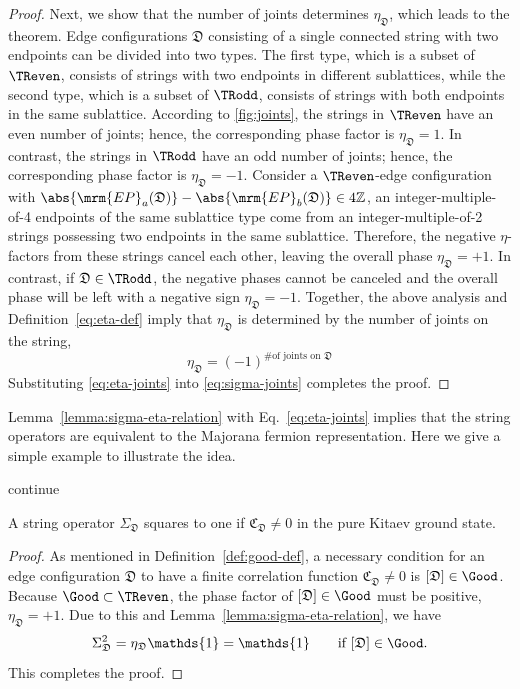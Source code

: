 \begin{proof}
    Next, we show that the number of joints determines $\eta_\mathfrak{D}$, which leads to the theorem. Edge configurations $\mathfrak{D}$ consisting of a single connected string with two endpoints can be divided into two types. The first type, which is a subset of $\TReven$, consists of strings with two endpoints in different sublattices, while the second type, which is a subset of $\TRodd$, consists of strings with both endpoints in the same sublattice. According to \autoref{fig:joints}, the strings in $\TReven$ have an even number of joints; hence, the corresponding phase factor is $\eta_\mathfrak{D} = 1$. In contrast, the strings in $\TRodd$ have an odd number of joints; hence, the corresponding phase factor is $\eta_\mathfrak{D} = -1$. Consider a $\TReven$-edge configuration with $\abs{\mrm{EP}_a(\mathfrak{D})} - \abs{\mrm{EP}_b(\mathfrak{D})} \in 4\mathbb{Z}$, an integer-multiple-of-4 endpoints of the same sublattice type come from an integer-multiple-of-2 strings possessing two endpoints in the same sublattice. Therefore, the negative $\eta$-factors from these strings cancel each other, leaving the overall phase $\eta_\mathfrak{D} = +1$. In contrast, if $\mathfrak{D} \in \TRodd$, the negative phases cannot be canceled and the overall phase will be left with a negative sign $\eta_\mathfrak{D} = -1$. Together, the above analysis and Definition~\eqref{eq:eta-def} imply that $\eta_\mathfrak{D}$ is determined by the number of joints on the string,
    \begin{equation}\label{eq:eta-joints}
        \eta_\mathfrak{D} = (-1)^{\text{\# of joints on $\mathfrak{D}$}} 
    \end{equation}
    Substituting \eqref{eq:eta-joints} into \eqref{eq:sigma-joints} completes the proof.
\end{proof}

Lemma~\ref{lemma:sigma-eta-relation} with Eq.~\eqref{eq:eta-joints} implies that the string operators are equivalent to the Majorana fermion representation. Here we give a simple example to illustrate the idea. 

\alert{continue} 

\begin{corollary}
    A string operator $\Sigma_\mathfrak{D}$ squares to one if $\mathfrak{C}_\mathfrak{D} \neq 0$ in the pure Kitaev ground state.
\end{corollary}
\begin{proof}
    As mentioned in Definition~\ref{def:good-def}, a necessary condition for an edge configuration $\mathfrak{D}$ to have a finite correlation function $\mathfrak{C}_\mathfrak{D} \neq 0$ is $[\mathfrak{D}] \in \Good$. Because $\Good\subset\TReven$, the phase factor of $[\mathfrak{D}] \in \Good$ must be positive, $\eta_\mathfrak{D} = +1$. Due to this and Lemma~\ref{lemma:sigma-eta-relation}, we have 
    \[
    \Sigma_\mathfrak{D}^2 = \eta_\mathfrak{D}\mathds{1} = \mathds{1} \qquad \text{if $[\mathfrak{D}] \in \Good$}.
    \]
    This completes the proof.
\end{proof}

